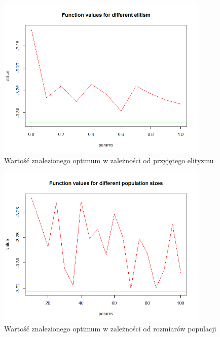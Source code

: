 \documentclass[11pt, a4paper]{article}
\begin{document}
\begin{figure}[H]
	\begin{center}
		\includegraphics[width=0.9\textwidth]{./assets/Hartman64.png} %
		\caption{Wartość znalezionego optimum w zależności od przyjętego elityzmu}
		\label{fig:gulf7}
	\end{center}
\end{figure}
\begin{figure}[H]
	\begin{center}
		\includegraphics[width=0.9\textwidth]{./assets/Hartman65.png} %
		\caption{Wartość znalezionego optimum w zależności od rozmiarów populacji}
		\label{fig:gulf7}
	\end{center}
\end{figure}
\end{document}
